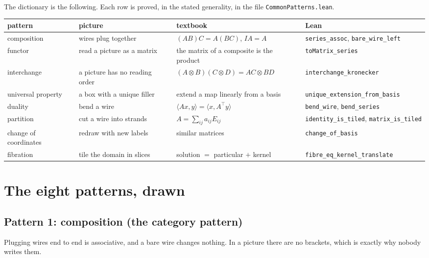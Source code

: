 \documentclass[11pt]{article}
\theoremstyle{definition}
\theoremstyle{plain}
\theoremstyle{remark}
\newcommand{\lean}[1]{\texttt{\small #1}}
\newcommand{\file}[1]{\texttt{\small #1}}
\begin{document}
\noindent
The dictionary is the following.  Each row is proved, in the stated generality,
in the file \file{CommonPatterns.lean}.

\begin{center}\small
\begin{tabular}{@{}p{25mm}p{29mm}p{33mm}p{40mm}@{}}
\toprule
\textbf{pattern} & \textbf{picture} & \textbf{textbook} & \textbf{Lean} \\
\midrule
composition & wires plug together & $(AB)C=A(BC)$, $IA=A$ & \lean{series\_assoc}, \lean{bare\_wire\_left} \\
functor & read a picture as a matrix & the matrix of a composite is the product & \lean{toMatrix\_series} \\
interchange & a picture has no reading order & $(A\otimes B)(C\otimes D)=AC\otimes BD$ & \lean{interchange\_kronecker} \\
universal property & a box with a unique filler & extend a map linearly from a basis & \lean{unique\_extension\_}\newline\lean{from\_basis} \\
duality & bend a wire & $\langle Ax,y\rangle=\langle x,A^{\!\top}y\rangle$ & \lean{bend\_wire}, \lean{bend\_series} \\
partition & cut a wire into strands & $A=\sum_{ij}a_{ij}E_{ij}$ & \lean{identity\_is\_tiled}, \lean{matrix\_is\_tiled} \\
change of coordinates & redraw with new labels & similar matrices & \lean{change\_of\_basis} \\
fibration & tile the domain in slices & solution $=$ particular $+$ kernel & \lean{fibre\_eq\_kernel\_}\newline\lean{translate} \\
\bottomrule
\end{tabular}
\end{center}

\section{The eight patterns, drawn}

\subsection{Pattern 1: composition (the category pattern)}

Plugging wires end to end is associative, and a bare wire changes nothing.  In a
picture there are no brackets, which is exactly why nobody writes them.
\end{document}
